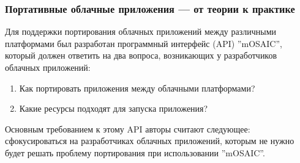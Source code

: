 \subsubsection*{Портативные облачные приложения --- от теории к практике}
Для поддержки портирования облачных приложений между различными платформами был разработан программный интерфейс (API) ''mOSAIC''\cite{portable-cloud-applications}, который должен ответить на два вопроса, возникающих у разработчиков облачных приложений:
\begin{enumerate}
    \item Как портировать приложения между облачными платформами?
    \item Какие ресурсы подходят для запуска приложения?
\end{enumerate}
Основным требованием к этому API авторы считают следующее: сфокусироваться на разработчиках облачных приложений, которым не нужно будет решать проблему портирования при использовании ''mOSAIC''.

